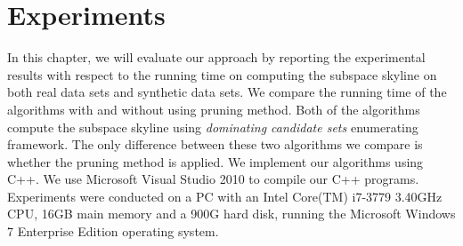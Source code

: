 
%
%

\chapter{Experiments}
\label{ch:exp}

In this chapter, we will evaluate our approach by reporting the experimental results with respect to the running time on computing the subspace skyline on both real data sets and synthetic data sets. We compare the running time of the algorithms with and without using pruning method. Both of the algorithms compute the subspace skyline using \emph{dominating candidate sets} enumerating framework. The only difference between these two algorithms we compare is whether the pruning method is applied.
We implement our algorithms using C++. We use Microsoft Visual Studio 2010 to compile our C++ programs. Experiments were conducted on a PC with an Intel Core(TM) i7-3779 3.40GHz CPU, 16GB main memory and a 900G hard disk, running the Microsoft Windows 7 Enterprise Edition operating system.

